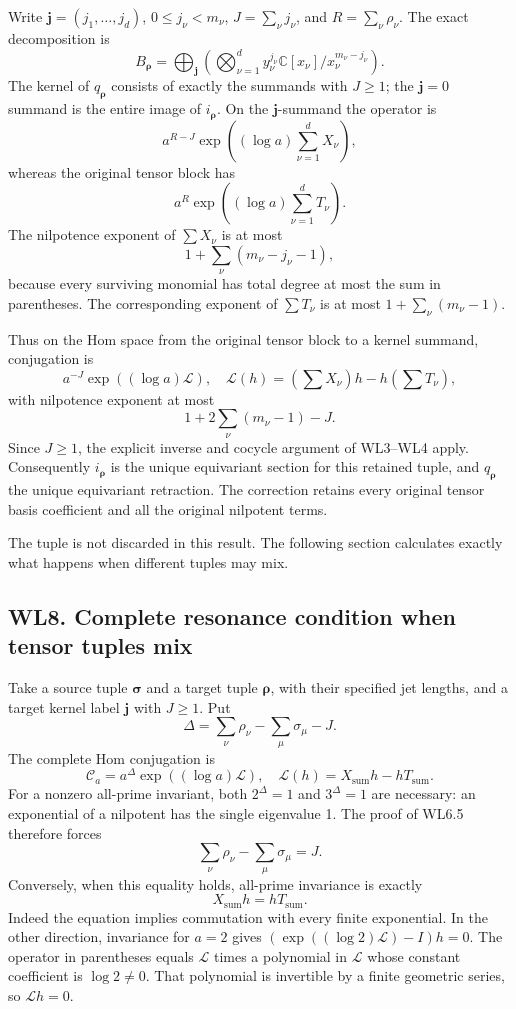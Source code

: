 Write \(\mathbf j=(j_1,\ldots,j_d)\), \(0\leq j_\nu<m_\nu\),
\(J=\sum_\nu j_\nu\), and \(R=\sum_\nu\rho_\nu\). The exact
decomposition is \[
 B_{\boldsymbol\rho}
 =\bigoplus_{\mathbf j}
 \left(\bigotimes_{\nu=1}^d y_\nu^{j_\nu}
       \mathbb C[x_\nu]/x_\nu^{m_\nu-j_\nu}\right).
\tag{WL7.2}
\] The kernel of \(q_{\boldsymbol\rho}\) consists of exactly the
summands with \(J\geq1\); the \(\mathbf j=0\) summand is the entire
image of \(i_{\boldsymbol\rho}\). On the \(\mathbf j\)-summand the
operator is \[
 a^{R-J}\exp\left((\log a)\sum_{\nu=1}^dX_\nu\right),
\tag{WL7.3}
\] whereas the original tensor block has \[
 a^R\exp\left((\log a)\sum_{\nu=1}^dT_\nu\right).
\tag{WL7.4}
\] The nilpotence exponent of \(\sum X_\nu\) is at most \[
 1+\sum_\nu(m_\nu-j_\nu-1),
\] because every surviving monomial has total degree at most the sum in
parentheses. The corresponding exponent of \(\sum T_\nu\) is at most
\(1+\sum_\nu(m_\nu-1)\).

Thus on the Hom space from the original tensor block to a kernel
summand, conjugation is \[
 a^{-J}\exp((\log a)\mathscr L),
\quad
 \mathscr L(h)=\left(\sum X_\nu\right)h-h\left(\sum T_\nu\right),
\tag{WL7.5}
\] with nilpotence exponent at most \[
 1+2\sum_\nu(m_\nu-1)-J.
\tag{WL7.6}
\] Since \(J\geq1\), the explicit inverse and cocycle argument of
WL3--WL4 apply. Consequently \(i_{\boldsymbol\rho}\) is the unique
equivariant section for this retained tuple, and \(q_{\boldsymbol\rho}\)
the unique equivariant retraction. The correction retains every original
tensor basis coefficient and all the original nilpotent terms.

The tuple is not discarded in this result. The following section
calculates exactly what happens when different tuples may mix.

\subsection{WL8. Complete resonance condition when tensor tuples
mix}\label{wl8.-complete-resonance-condition-when-tensor-tuples-mix}

Take a source tuple \(\boldsymbol\sigma\) and a target tuple
\(\boldsymbol\rho\), with their specified jet lengths, and a target
kernel label \(\mathbf j\) with \(J\geq1\). Put \[
 \Delta=\sum_\nu\rho_\nu-\sum_\mu\sigma_\mu-J.
\tag{WL8.1}
\] The complete Hom conjugation is \[
 \mathscr C_a=a^\Delta\exp((\log a)\mathscr L),
\quad
 \mathscr L(h)=X_{\mathrm{sum}}h-hT_{\mathrm{sum}}.
\tag{WL8.2}
\] For a nonzero all-prime invariant, both \(2^\Delta=1\) and
\(3^\Delta=1\) are necessary: an exponential of a nilpotent has the
single eigenvalue 1. The proof of WL6.5 therefore forces \[
 \boxed{\sum_\nu\rho_\nu-\sum_\mu\sigma_\mu=J.}
\tag{WL8.3}
\] Conversely, when this equality holds, all-prime invariance is exactly
\[
 X_{\mathrm{sum}}h=hT_{\mathrm{sum}}.
\tag{WL8.4}
\] Indeed the equation implies commutation with every finite
exponential. In the other direction, invariance for \(a=2\) gives
\((\exp((\log2)\mathscr L)-I)h=0\). The operator in parentheses equals
\(\mathscr L\) times a polynomial in \(\mathscr L\) whose constant
coefficient is \(\log2\ne0\). That polynomial is invertible by a finite
geometric series, so \(\mathscr Lh=0\).

